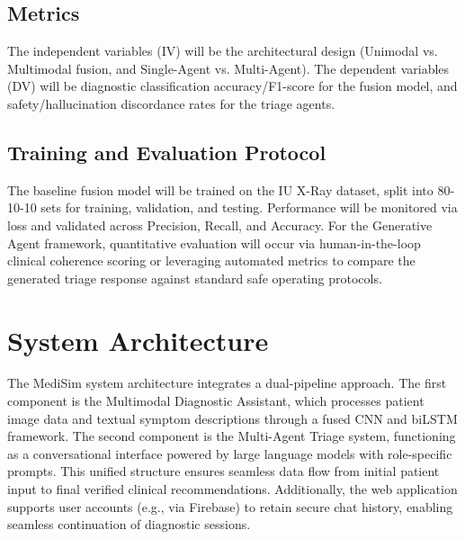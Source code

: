 \documentclass[11pt,a4paper]{article}
\begin{document}
\subsection{Metrics}
The independent variables (IV) will be the architectural design (Unimodal vs. Multimodal fusion, and Single-Agent vs. Multi-Agent). The dependent variables (DV) will be diagnostic classification accuracy/F1-score for the fusion model, and safety/hallucination discordance rates for the triage agents.

\subsection{Training and Evaluation Protocol}
The baseline fusion model will be trained on the IU X-Ray dataset, split into 80-10-10 sets for training, validation, and testing. Performance will be monitored via loss and validated across Precision, Recall, and Accuracy. For the Generative Agent framework, quantitative evaluation will occur via human-in-the-loop clinical coherence scoring or leveraging automated metrics to compare the generated triage response against standard safe operating protocols.

\begin{table}[h]
\centering
{}
\caption{Performance comparison between baseline architectures and the proposed MediSim components (Evaluation placeholders).}
\label{tab:performance_comparison}
\end{table}

\section{System Architecture}

The MediSim system architecture integrates a dual-pipeline approach. The first component is the Multimodal Diagnostic Assistant, which processes patient image data and textual symptom descriptions through a fused CNN and biLSTM framework. The second component is the Multi-Agent Triage system, functioning as a conversational interface powered by large language models with role-specific prompts. This unified structure ensures seamless data flow from initial patient input to final verified clinical recommendations. Additionally, the web application supports user accounts (e.g., via Firebase) to retain secure chat history, enabling seamless continuation of diagnostic sessions.
\end{document}
